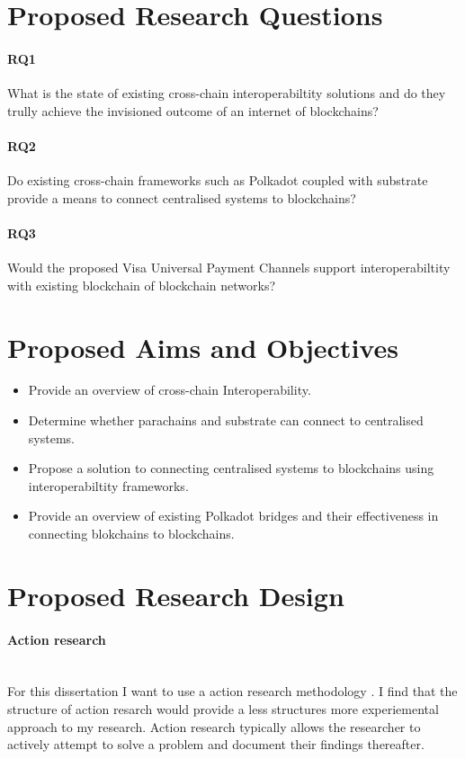 \documentclass[12pt]{article}
\begin{document}
\section{Proposed Research Questions}
\paragraph{RQ1} What is the state of existing cross-chain interoperabiltity solutions and do they trully achieve the invisioned outcome of an internet of blockchains?
\paragraph{RQ2} Do existing cross-chain frameworks such as Polkadot coupled with substrate provide a means to connect centralised systems to blockchains?
\paragraph{RQ3} Would the proposed Visa Universal Payment Channels support interoperabiltity with existing blockchain of blockchain networks?

\section{Proposed Aims and Objectives}
\begin{itemize}
    \item Provide an overview of cross-chain Interoperability.
    \item Determine whether parachains and substrate can connect to centralised systems.
    \item Propose a solution to connecting centralised systems to blockchains using interoperabiltity frameworks.
    \item Provide an overview of existing Polkadot bridges and their effectiveness in connecting blokchains to blockchains.
\end{itemize}

\section{Proposed Research Design}
\paragraph{Action research}\mbox{} \\
For this dissertation I want to use a action research methodology \autocite{10.5555/2842927}. I find that the structure of action resarch would provide a
less structures more experiemental approach to my research. Action research typically allows the researcher to actively attempt to solve a problem and document their findings thereafter.
\end{document}
